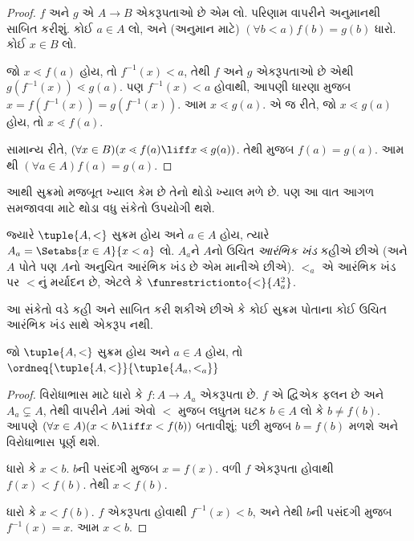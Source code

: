 \begin{proof}
$f$ અને $g$ એ $A \to B$ એકરૂપતાઓ છે એમ લો.
પરિણામ  વાપરીને અનુમાનથી
સાબિત કરીશું.
કોઈ $a\in A$ લો, અને (અનુમાન માટે)
$(\forall b < a)f(b) = g(b)$ ધારો. કોઈ $x \in B$ લો.

જો $x \lessdot f(a)$ હોય, તો $f^{-1}(x) < a$,
તેથી $f$ અને $g$ એકરૂપતાઓ છે એથી
$g(f^{-1}(x)) \lessdot
g(a)$. પણ $f^{-1}(x) < a$ હોવાથી, આપણી ધારણા મુજબ
$x =f(f^{-1}(x)) = g(f^{-1}(x))$.
આમ $x \lessdot g(a)$. એ જ રીતે, જો
$x \lessdot g(a)$ હોય, તો $x \lessdot f(a)$.

સામાન્ય રીતે,
$(\forall x \in B)(x \lessdot f(a) \liff x \lessdot
g(a))$. તેથી
મુજબ $f(a) = g(a)$. આમ
થી
$(\forall
a \in A)f(a) = g(a)$.
\end{proof}\noindent
આથી સુક્રમો મજબૂત ખ્યાલ કેમ છે તેનો થોડો ખ્યાલ મળે છે.
પણ આ વાત આગળ સમજાવવા માટે થોડા વધુ સંકેતો ઉપયોગી થશે.

\begin{defn}
જ્યારે $\tuple{A, <}$ સુક્રમ હોય અને $a \in A$ હોય, ત્યારે
$A_a = \Setabs{x \in A}{x
< a}$ લો. $A_a$ને $A$નો ઉચિત \emph{આરંભિક ખંડ} કહીએ
છીએ (અને $A$ પોતે પણ $A$નો અનુચિત આરંભિક ખંડ છે એમ માનીએ છીએ).
$<_a$ એ આરંભિક ખંડ પર $<$નું મર્યાદન છે, એટલે કે
$\funrestrictionto{\mathord{<}}{A_a^2}$.
\end{defn}
\noindent
આ સંકેતો વડે કહી અને સાબિત કરી શકીએ છીએ કે કોઈ સુક્રમ
પોતાના કોઈ ઉચિત આરંભિક ખંડ સાથે એકરૂપ નથી.

\begin{lem}
જો $\tuple{A, <}$ સુક્રમ હોય અને $a \in A$ હોય, તો
$\ordneq{\tuple{A, <}}{\tuple{A_a, <_a}}$
\end{lem}

\begin{proof}
વિરોધાભાસ માટે ધારો કે $f \colon A \to A_a$ એકરૂપતા
છે. $f$ એ દ્વિએક ફલન છે અને $A_a \subsetneq A$,
તેથી  વાપરીને
$A$માં એવો $<$ મુજબ લઘુતમ ઘટક $b \in A$ લો
કે $b \neq f(b)$. આપણે
$(\forall x \in A)(x<b \liff x < f(b))$ બતાવીશું;
પછી
મુજબ $b =
f(b)$ મળશે અને વિરોધાભાસ પૂર્ણ થશે.

ધારો કે $x < b$. $b$ની પસંદગી મુજબ $x = f(x)$.
વળી $f$ એકરૂપતા હોવાથી $f(x) <
f(b)$. તેથી $x < f(b)$.

ધારો કે $x < f(b)$. $f$ એકરૂપતા હોવાથી
$f^{-1}(x) < b$, અને તેથી $b$ની પસંદગી મુજબ
$f^{-1}(x) = x$. આમ $x < b$.
\end{proof}

